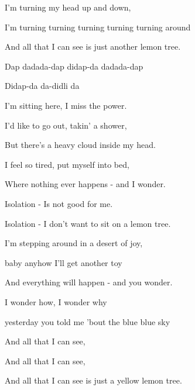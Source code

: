 \begin{song}
\begin{chorusbox}{\Chorus}
\bigskip

I'm turning my head up and down, \par
I'm turning turning turning turning turning around \par
And all that I can see is just another lemon tree.  \par
\end{chorusbox}

\bigskip

Dap  dadada-dap didap-da dadada-dap \par
{}Didap-da  da-didli da   \par

\bigskip

I'm sitting here, I miss the power. \par
I'd like to go out, takin' a shower, \par
But there's a heavy cloud inside my head. \par
I feel so tired, put myself into bed, \par
Where nothing ever happens -  and I wonder.   \par

\bigskip

 Isolation - Is not good for me. \par
{} Isolation - I don't want to  sit on a lemon tree. \par

\bigskip

I'm stepping around in a desert of joy, \par
{}baby anyhow I'll get another toy \par
And everything will happen -  and you wonder.   \par

\bigskip

\Chorus

\bigskip

I wonder how, I wonder why \par
{}yesterday you told me 'bout the blue blue sky \par
And all that I can see, \par
And all that I can see, \par
And all that I can see is just a yellow lemon tree. \par

\end{song}
